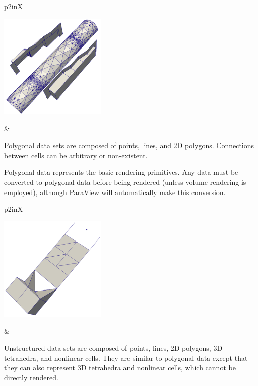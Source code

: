 \noindent
\begin{tabularx}{\linewidth}{p{2in}X}
  \parbox{2in}{\includegraphics[width=2in]{images/PolyData}} &
  \begin{minipage}{\linewidth}

    Polygonal data sets are composed of points, lines, and 2D polygons.
    Connections between cells can be arbitrary or non-existent.
    
    Polygonal data represents the basic rendering primitives.  Any data
    must be converted to polygonal data before being rendered (unless
    volume rendering is employed), although ParaView will automatically
    make this conversion.
  \end{minipage}
\end{tabularx}

\noindent
\begin{tabularx}{\linewidth}{p{2in}X}
  \parbox{2in}{\includegraphics[width=2in]{images/UnstructuredGrid}} &
  \begin{minipage}{\linewidth}

    Unstructured data sets are composed of points, lines, 2D polygons, 3D
    tetrahedra, and nonlinear cells.  They are similar to polygonal data
    except that they can also represent 3D tetrahedra and nonlinear cells,
    which cannot be directly rendered.
  \end{minipage}
\end{tabularx}

